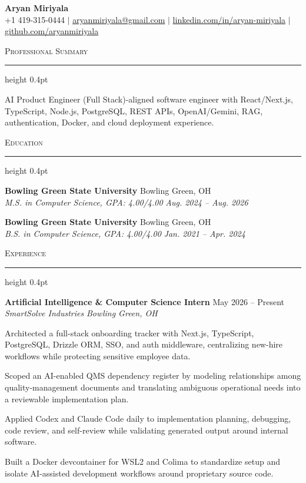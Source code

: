 \documentclass[letterpaper,11pt]{article}
\newcommand{\resumesection}[1]{%
  \par\vspace{2pt}%
  {\large\scshape #1}\par\vspace{2pt}%
  \hrule height 0.4pt\vspace{2pt}%
}
\newcommand{\resumeSubheading}[4]{
  \textbf{#1} \hfill #2\\
  \textit{#3} \hfill \textit{#4}
}
\begin{document}
\begin{center}
  {\LARGE \textbf{Aryan Miriyala}}\\[-1pt]
  \small
  +1 419-315-0444 $|$
  \href{mailto:aryanmiriyala@gmail.com}{aryanmiriyala@gmail.com} $|$
  \href{https://www.linkedin.com/in/aryan-miriyala-7788a21b6/}{linkedin.com/in/aryan-miriyala} $|$
  \href{https://github.com/aryanmiriyala}{github.com/aryanmiriyala}
\end{center}\vspace{-10pt}

\resumesection{Professional Summary}
AI Product Engineer (Full Stack)-aligned software engineer with React/Next.js, TypeScript, Node.js, PostgreSQL, REST APIs, OpenAI/Gemini, RAG, authentication, Docker, and cloud deployment experience.

\resumesection{Education}
\resumeSubheading
{Bowling Green State University}{Bowling Green, OH}
{M.S. in Computer Science, GPA: 4.00/4.00}{Aug. 2024 -- Aug. 2026}

\resumeSubheading
{Bowling Green State University}{Bowling Green, OH}
{B.S. in Computer Science, GPA: 4.00/4.00}{Jan. 2021 -- Apr. 2024}

\resumesection{Experience}
\resumeSubheading
{Artificial Intelligence \& Computer Science Intern}{May 2026 -- Present}
{SmartSolve Industries}{Bowling Green, OH}
\begin{tightitemize}
  \item Architected a full-stack onboarding tracker with Next.js, TypeScript, PostgreSQL, Drizzle ORM, SSO, and auth middleware, centralizing new-hire workflows while protecting sensitive employee data.
  \item Scoped an AI-enabled QMS dependency register by modeling relationships among quality-management documents and translating ambiguous operational needs into a reviewable implementation plan.
  \item Applied Codex and Claude Code daily to implementation planning, debugging, code review, and self-review while validating generated output around internal software.
  \item Built a Docker devcontainer for WSL2 and Colima to standardize setup and isolate AI-assisted development workflows around proprietary source code.
\end{tightitemize}
\end{document}

